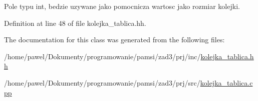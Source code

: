 Pole typu int, bedzie uzywane jako pomocnicza wartosc jako rozmiar kolejki. 



Definition at line 48 of file kolejka\-\_\-tablica.\-hh.



The documentation for this class was generated from the following files\-:\begin{DoxyCompactItemize}
\item 
/home/pawel/\-Dokumenty/programowanie/pamsi/zad3/prj/inc/\hyperlink{kolejka__tablica_8hh}{kolejka\-\_\-tablica.\-hh}\item 
/home/pawel/\-Dokumenty/programowanie/pamsi/zad3/prj/src/\hyperlink{kolejka__tablica_8cpp}{kolejka\-\_\-tablica.\-cpp}\end{DoxyCompactItemize}
